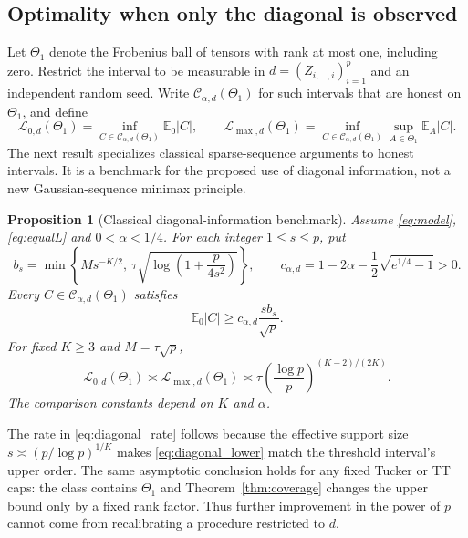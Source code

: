 \documentclass[11pt]{article}
\newtheorem{proposition}{Proposition}
\theoremstyle{remark}
\newcommand{\E}{\mathbb E}
\begin{document}
\subsection{Optimality when only the diagonal is observed}\label{sec:diagonal_optimality}

Let $\Theta_1$ denote the Frobenius ball of tensors with rank at most one, including zero. Restrict the interval to be measurable in $d=(Z_{i,\ldots,i})_{i=1}^p$ and an independent random seed. Write $\mathcal C_{\alpha,d}(\Theta_1)$ for such intervals that are honest on $\Theta_1$, and define
\[
 \mathcal L_{0,d}(\Theta_1)=\inf_{C\in\mathcal C_{\alpha,d}(\Theta_1)}\E_0|C|,
 \qquad
 \mathcal L_{\max,d}(\Theta_1)
 =\inf_{C\in\mathcal C_{\alpha,d}(\Theta_1)}\sup_{A\in\Theta_1}\E_A|C|.
\]
The next result specializes classical sparse-sequence arguments \citep{cailownonconvex2004,collier2017} to honest intervals. It is a benchmark for the proposed use of diagonal information, not a new Gaussian-sequence minimax principle.

\begin{proposition}[Classical diagonal-information benchmark]\label{prop:diagonal_minimax}
Assume \eqref{eq:model}, \eqref{eq:equalL} and $0<\alpha<1/4$. For each integer $1\le s\le p$, put
\[
 b_s=\min\left\{M s^{-K/2},\
       \tau\sqrt{\log\left(1+\frac{p}{4s^2}\right)}\right\},
 \qquad
 c_{\alpha,d}=1-2\alpha-\frac12\sqrt{e^{1/4}-1}>0.
\]
Every $C\in\mathcal C_{\alpha,d}(\Theta_1)$ satisfies
\begin{equation}\label{eq:diagonal_lower}
 \E_0|C|\ge c_{\alpha,d}\frac{s b_s}{\sqrt p}.
\end{equation}
For fixed $K\ge3$ and $M=\tau\sqrt p$,
\begin{equation}\label{eq:diagonal_rate}
 \mathcal L_{0,d}(\Theta_1)\asymp
 \mathcal L_{\max,d}(\Theta_1)\asymp
 \tau\left(\frac{\log p}{p}\right)^{(K-2)/(2K)}.
\end{equation}
The comparison constants depend on $K$ and $\alpha$.
\end{proposition}

The rate in \eqref{eq:diagonal_rate} follows because the effective support size $s\asymp(p/\log p)^{1/K}$ makes \eqref{eq:diagonal_lower} match the threshold interval's upper order. The same asymptotic conclusion holds for any fixed Tucker or TT caps: the class contains $\Theta_1$ and Theorem~\ref{thm:coverage} changes the upper bound only by a fixed rank factor. Thus further improvement in the power of $p$ cannot come from recalibrating a procedure restricted to $d$.
\end{document}
